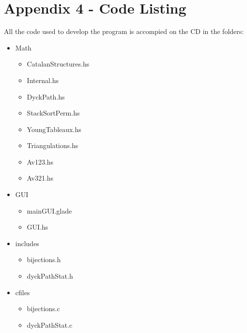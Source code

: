 \documentclass[12pt]{article}
\begin{document}
\section{Appendix 4 - Code Listing}
All the code used to develop the program is accompied on the CD in the folders:
\begin{itemize}
	\item Math
	\begin{itemize}
		\item CatalanStructures.hs
		\item Internal.hs
		\item DyckPath.hs
		\item StackSortPerm.hs
		\item YoungTableaux.hs
		\item Triangulations.hs
		\item Av123.hs
		\item Av321.hs
	\end{itemize}
	\item GUI
	\begin{itemize}
		\item mainGUI.glade
		\item GUI.hs
	\end{itemize}
	\item includes
	\begin{itemize}
		\item bijections.h
		\item dyckPathStat.h
	\end{itemize}
	\item cfiles
	\begin{itemize}
		\item bijections.c
		\item dyckPathStat.c
	\end{itemize}
\end{itemize}
\end{document}
